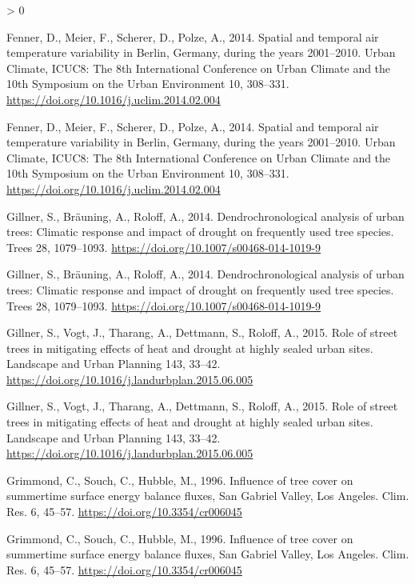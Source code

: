 \documentclass[
]{article}
\newlength{\cslhangindent}
\newenvironment{CSLReferences}[2] %
 {%
  \setlength{\parindent}{0pt}
  \ifodd #1 \everypar{\setlength{\hangindent}{\cslhangindent}}\ignorespaces\fi
  \ifnum #2 > 0
  \setlength{\parskip}{#2\baselineskip}
  \fi
 }%
 {}
\begin{document}
\begin{CSLReferences}{1}{0}
\leavevmode\hypertarget{ref-fenner2014}{}%
Fenner, D., Meier, F., Scherer, D., Polze, A., 2014. Spatial and temporal air temperature variability in {Berlin}, {Germany}, during the years 2001--2010. Urban Climate, {ICUC8}: {The} 8th {International Conference} on {Urban Climate} and the 10th {Symposium} on the {Urban Environment} 10, 308--331. \url{https://doi.org/10.1016/j.uclim.2014.02.004}

\leavevmode\hypertarget{ref-fenner2014}{}%
Fenner, D., Meier, F., Scherer, D., Polze, A., 2014. Spatial and temporal air temperature variability in {Berlin}, {Germany}, during the years 2001--2010. Urban Climate, {ICUC8}: {The} 8th {International Conference} on {Urban Climate} and the 10th {Symposium} on the {Urban Environment} 10, 308--331. \url{https://doi.org/10.1016/j.uclim.2014.02.004}

\leavevmode\hypertarget{ref-gillner2014}{}%
Gillner, S., Bräuning, A., Roloff, A., 2014. Dendrochronological analysis of urban trees: Climatic response and impact of drought on frequently used tree species. Trees 28, 1079--1093. \url{https://doi.org/10.1007/s00468-014-1019-9}

\leavevmode\hypertarget{ref-gillner2014}{}%
Gillner, S., Bräuning, A., Roloff, A., 2014. Dendrochronological analysis of urban trees: Climatic response and impact of drought on frequently used tree species. Trees 28, 1079--1093. \url{https://doi.org/10.1007/s00468-014-1019-9}

\leavevmode\hypertarget{ref-gillner2015}{}%
Gillner, S., Vogt, J., Tharang, A., Dettmann, S., Roloff, A., 2015. Role of street trees in mitigating effects of heat and drought at highly sealed urban sites. Landscape and Urban Planning 143, 33--42. \url{https://doi.org/10.1016/j.landurbplan.2015.06.005}

\leavevmode\hypertarget{ref-gillner2015}{}%
Gillner, S., Vogt, J., Tharang, A., Dettmann, S., Roloff, A., 2015. Role of street trees in mitigating effects of heat and drought at highly sealed urban sites. Landscape and Urban Planning 143, 33--42. \url{https://doi.org/10.1016/j.landurbplan.2015.06.005}

\leavevmode\hypertarget{ref-grimmond1996}{}%
Grimmond, C., Souch, C., Hubble, M., 1996. Influence of tree cover on summertime surface energy balance fluxes, {San Gabriel Valley}, {Los Angeles}. Clim. Res. 6, 45--57. \url{https://doi.org/10.3354/cr006045}

\leavevmode\hypertarget{ref-grimmond1996}{}%
Grimmond, C., Souch, C., Hubble, M., 1996. Influence of tree cover on summertime surface energy balance fluxes, {San Gabriel Valley}, {Los Angeles}. Clim. Res. 6, 45--57. \url{https://doi.org/10.3354/cr006045}


\end{CSLReferences}
\end{document}
